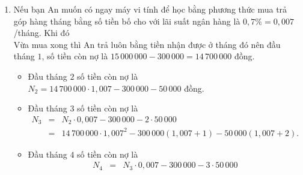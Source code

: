 \begin{ex}
{\begin{enumerate}
\begin{itemize}
\begin{eqnarray*}
& & + 50\,000(1{,}006^3+2\cdot1{,}006^2+3\cdot1{,}006+4).
\end{eqnarray*}
\item Đầu tháng thứ $n$ số tiền có là
\begin{eqnarray*}
T_n
&=&T_{n-1}\cdot1{,}006+300\,000+(n-1)\cdot50\,000\\
&=& 300\,000(1{,}006^{n-1}+ 1{,}006^{n-2}+\cdots+1{,}006^2+1{,}006+1)\\
&&
+50\,000\left[1{,}006^{n-2}+2\cdot1{,}006^{n-3}+\cdots+(n-2)\cdot1{,}006+(n-1)\right].
\end{eqnarray*}
\end{itemize}
Thử các giá trị $n$ trong công thức trên, ta thấy $n=20$ thì $T_n=16\,205\,523$. Vậy sau $20$ tháng thì bạn An mới đủ tiền mua máy vi tính.\\
{\bf Sử dụng quy trình bấm máy tính trên máy tính cầm tay như sau:}\\
Vì tháng thứ $n$ số tiền có là
$T_n=T_{n-1}\cdot1{,}006+300\,000+(n-1)\cdot50\,000$.
\begin{itemize}
\item Nhập vào màn hình $X=X+1\colon A=1{,}006\cdot A+300\,000+50\,000(X-1)$.
\item Ấn CALC, gán $X=1$, $A=300\,000$, $=, =, \cdots, =$ đến khi $A$ vươt quá mười lăm triệu.
\end{itemize}
Ta thấy khi $X=20$ thì $A> 15\,000\, 000$.
\item Nếu bạn An muốn có ngay máy vi tính để học bằng phương thức mua trả góp hàng tháng bằng số  tiền bố cho với lãi suất ngân hàng là $0,7\%= 0{,}007$/tháng. Khi đó\\
Vừa mua xong thì An trả luôn bằng tiền nhận được ở tháng đó nên đầu tháng $1$, số tiền còn nợ là  $15\,000\,000 - 300\, 000 = 14\,700\,000$ đồng.
\begin{itemize}
\item Đầu tháng $2$ số tiền còn nợ là\\
$N_2= 14\,700\,000\cdot1{,}007-300\,000-50\,000$ đồng.
\item Đầu tháng $3$ số tiền còn nợ là
\begin{eqnarray*}
N_3
&=&N_2\cdot0{,}007-300\,000-2\cdot50\,000\\
&=& 14\,700\,000\cdot1{,}007^2-300\,000(1{,}007+1)-50\,000(1{,}007+2).
\end{eqnarray*}
\item Đầu tháng $4$ số tiền còn nợ là
\begin{eqnarray*}
N_4
&=&N_3\cdot0{,}007-300\,000-3\cdot50\,000\\

\end{eqnarray*}
\end{itemize}
\end{enumerate}}
\end{ex}
